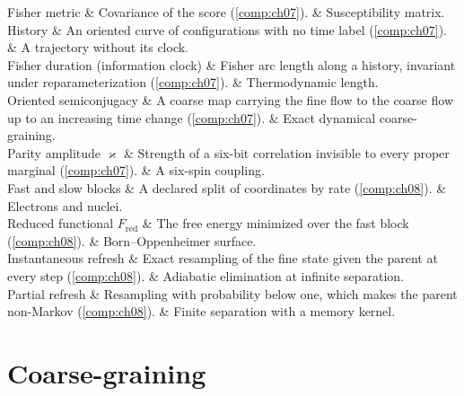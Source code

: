 \begin{decoder}
Fisher metric & Covariance of the score (\cref{comp:ch07}). & Susceptibility matrix. \\
History & An oriented curve of configurations with no time label (\cref{comp:ch07}). & A trajectory without its clock. \\
Fisher duration (information clock) & Fisher arc length along a history, invariant under reparameterization (\cref{comp:ch07}). & Thermodynamic length. \\
Oriented semiconjugacy & A coarse map carrying the fine flow to the coarse flow up to an increasing time change (\cref{comp:ch07}). & Exact dynamical coarse-graining. \\
Parity amplitude $\varkappa$ & Strength of a six-bit correlation invisible to every proper marginal (\cref{comp:ch07}). & A six-spin coupling. \\
Fast and slow blocks & A declared split of coordinates by rate (\cref{comp:ch08}). & Electrons and nuclei. \\
Reduced functional $F_{\mathrm{red}}$ & The free energy minimized over the fast block (\cref{comp:ch08}). & Born--Oppenheimer surface. \\
Instantaneous refresh & Exact resampling of the fine state given the parent at every step (\cref{comp:ch08}). & Adiabatic elimination at infinite separation. \\
Partial refresh & Resampling with probability below one, which makes the parent non-Markov (\cref{comp:ch08}). & Finite separation with a memory kernel. \\
\end{decoder}

\section*{Coarse-graining}

